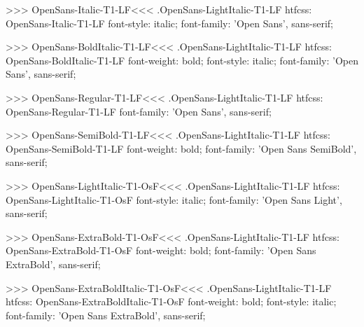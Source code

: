 >>>
\<OpenSans-Italic-T1-LF\><<<
.OpenSans-LightItalic-T1-LF
htfcss:  OpenSans-Italic-T1-LF  font-style: italic; font-family: 'Open Sans', sans-serif;

>>>
\<OpenSans-BoldItalic-T1-LF\><<<
.OpenSans-LightItalic-T1-LF
htfcss:  OpenSans-BoldItalic-T1-LF  font-weight: bold; font-style: italic; font-family: 'Open Sans', sans-serif;

>>>
\<OpenSans-Regular-T1-LF\><<<
.OpenSans-LightItalic-T1-LF
htfcss:  OpenSans-Regular-T1-LF  font-family: 'Open Sans', sans-serif;

>>>
\<OpenSans-SemiBold-T1-LF\><<<
.OpenSans-LightItalic-T1-LF
htfcss:  OpenSans-SemiBold-T1-LF  font-weight: bold; font-family: 'Open Sans SemiBold', sans-serif;

>>>
\<OpenSans-LightItalic-T1-OsF\><<<
.OpenSans-LightItalic-T1-LF
htfcss:  OpenSans-LightItalic-T1-OsF  font-style: italic; font-family: 'Open Sans Light', sans-serif;

>>>
\<OpenSans-ExtraBold-T1-OsF\><<<
.OpenSans-LightItalic-T1-LF
htfcss:  OpenSans-ExtraBold-T1-OsF  font-weight: bold; font-family: 'Open Sans ExtraBold', sans-serif;

>>>
\<OpenSans-ExtraBoldItalic-T1-OsF\><<<
.OpenSans-LightItalic-T1-LF
htfcss:  OpenSans-ExtraBoldItalic-T1-OsF  font-weight: bold; font-style: italic; font-family: 'Open Sans ExtraBold', sans-serif;

